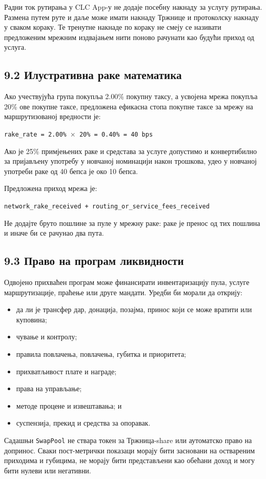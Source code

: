 \documentclass[11pt]{article}
\begin{document}
Радни ток рутирања у CLC App-у не додаје посебну накнаду за услугу рутирања. Размена путем руте и даље може имати накнаду Тржнице и протоколску накнаду у сваком кораку. Те тренутне накнаде по кораку не смеју се називати предложеним мрежним издвајањем нити поново рачунати као будући приход од услуга.

\subsection*{9.2 Илустративна раке математика}

Ако учествујућа група покупља 2.00\% покупну таксу, а усвојена мрежа покупља 20\% ове покупне таксе, предложена ефикасна стопа покупне таксе за мрежу на маршрутизованој вредности је:

\texttt{rake\_rate = 2.00\% $\times$ 20\% = 0.40\% = 40 bps}

Ако је 25\% примјењених раке и средстава за услуге допустимо и конвертибилно за пријављену употребу у новчаној номинацији након трошкова, удео у новчаној употреби раке од 40 бепса је око 10 бепса.

Предложена приход мрежа је:

\texttt{network\_rake\_received + routing\_or\_service\_fees\_received}

Не додајте бруто пошлине за пуле у мрежну раке: раке је пренос од тих пошлина и иначе би се рачунао два пута.

\subsection*{9.3 Право на програм ликвидности}

Одвојено прихваћен програм може финансирати инвентаризацију пула, услуге маршрутизације, праћење или друге мандати. Уредби би морали да открију:

\begin{itemize}[leftmargin=*]
\item да ли је трансфер дар, донација, позајма, принос који се може вратити или куповина;
\item чување и контролу;
\item правила повлачења, повлачења, губитка и приоритета;
\item прихватљивост плате и награде;
\item права на управљање;
\item методе процене и извештавања; и
\item суспензија, прекид и средства за опоравак.
\end{itemize}
Садашњи \texttt{SwapPool} не ствара токен за Тржница-share или аутоматско право на допринос. Сваки пост-метрички показаци морају бити засновани на оствареним приходима и губицима, не морају бити представљени као обећани доход и могу бити нулеви или негативни.
\end{document}
